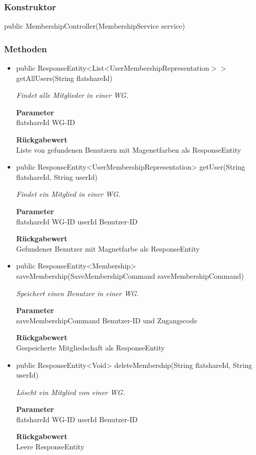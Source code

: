 \documentclass[a4paper]{scrreprt}
\begin{document}
    \subsubsection{Konstruktor}
    public MembershipController(MembershipService service)
    \subsubsection{Methoden}
    \begin{itemize}
    	\item{public ResponseEntity<List<UserMembershipRepresentation$>>$ getAllUsers(String flatshareId)}
    	
    	\textit{Findet alle Mitglieder in einer WG.}
    	
    	\textbf{Parameter} \\
    	flatshareId WG-ID
    	
    	\textbf{Rückgabewert} \\
    	Liste von gefundenen Benutzern mit Magenetfarben als ResponseEntity        \item{public ResponseEntity<UserMembershipRepresentation> getUser(String flatshareId, String userId)}
    	
    	\textit{Findet ein Mitglied in einer WG.}
    	
    	\textbf{Parameter} \\
    	flatshareId WG-ID
    	userId Benutzer-ID
    	
    	\textbf{Rückgabewert} \\
    	Gefundener Benutzer mit Magnetfarbe als ResponseEntity        \item{public ResponseEntity<Membership> saveMembership(SaveMembershipCommand saveMembershipCommand)}
    	
    	\textit{Speichert einen Benutzer in einer WG.}
    	
    	\textbf{Parameter} \\
    	saveMembershipCommand Benutzer-ID und Zugangscode
    	
    	\textbf{Rückgabewert} \\
    	Gespeicherte Mitgliedschaft als ResponseEntity        \item{public ResponseEntity<Void> deleteMembership(String flatshareId, String userId)}
    	
    	\textit{Löscht ein Mitglied von einer WG.}
    	
    	\textbf{Parameter} \\
    	flatshareId WG-ID
    	userId Benutzer-ID
    	
    	\textbf{Rückgabewert} \\
    	Leere ResponseEntity
    \end{itemize}
\end{document}
